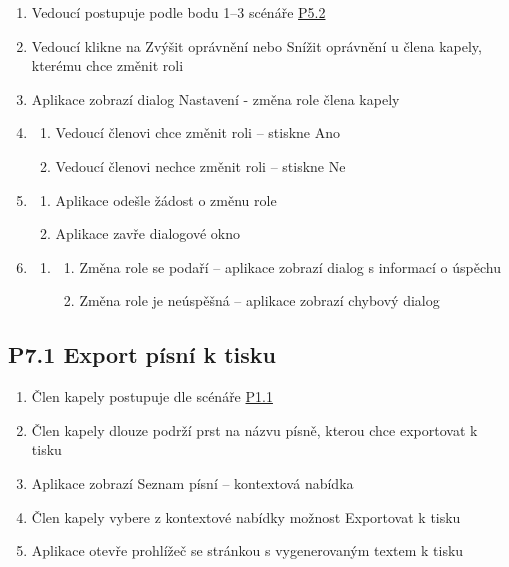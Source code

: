 \begin{enumerate}
    \item Vedoucí postupuje podle bodu 1--3 scénáře \hyperref[P5.2]{P5.2}
    \item Vedoucí klikne na Zvýšit oprávnění nebo Snížit oprávnění u člena kapely, kterému chce změnit roli
    \item Aplikace zobrazí dialog Nastavení - změna role člena kapely
    \item \begin{enumerate}
        \item Vedoucí členovi chce změnit roli -- stiskne Ano
        \item Vedoucí členovi nechce změnit roli -- stiskne Ne
    \end{enumerate}
    \item \begin{enumerate}
        \item Aplikace odešle žádost o změnu role
        \item Aplikace zavře dialogové okno
    \end{enumerate}
    \item \begin{enumerate}
        \item \begin{enumerate}
            \item Změna role se podaří -- aplikace zobrazí dialog s informací o úspěchu
            \item Změna role je neúspěšná -- aplikace zobrazí chybový dialog
        \end{enumerate}
    \end{enumerate}
\end{enumerate}

\subsection{P7.1 Export písní k tisku}
\label{P7.1}

\begin{enumerate}
    \item Člen kapely postupuje dle scénáře \hyperref[P1.1]{P1.1}
    \item Člen kapely dlouze podrží prst na názvu písně, kterou chce exportovat k tisku
    \item Aplikace zobrazí Seznam písní -- kontextová nabídka
    \item Člen kapely vybere z kontextové nabídky možnost Exportovat k tisku
    \item Aplikace otevře prohlížeč se stránkou s vygenerovaným textem k tisku
\end{enumerate}

